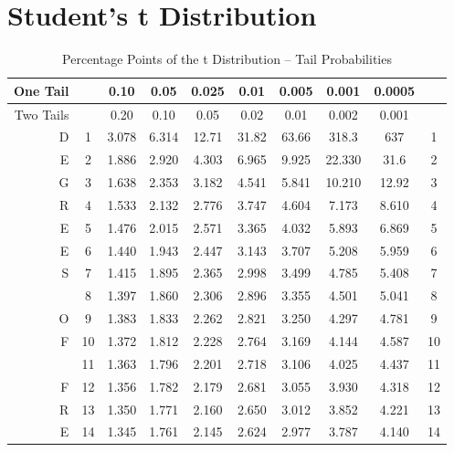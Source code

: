 \label{AppendixA}
\chapter{Student's t Distribution}
\newpage
{}

\begin{table}[H]
\caption{Percentage Points of the t Distribution -- Tail Probabilities} \label{Appendix}
\begin{center}
{\tiny \begin{tabular}{|r|c|c|c|c|c|c|c|c|c|}
\hline One Tail & & 0.10 & 0.05 & 0.025 & 0.01 & 0.005 & 0.001 & 0.0005 &\\ 
\hline Two Tails & & 0.20 &   0.10 &   0.05 &   0.02  &  0.01  &  0.002 & 0.001 & \\ 
\hline D  & 1 &   3.078  & 6.314 & 12.71  & 31.82  & 63.66 & 318.3  & 637 & 1  \\ 
\hline E  & 2 &   1.886  & 2.920 &  4.303 &  6.965 &  9.925 & 22.330 & 31.6 & 2 \\ 
\hline G  & 3 &   1.638  & 2.353 &  3.182 &  4.541 &  5.841 & 10.210 & 12.92  &   3  \\ 
\hline R  & 4 &   1.533  & 2.132 &  2.776 &  3.747 &  4.604 &  7.173 &  8.610 &   4  \\ 
\hline E  & 5 &   1.476 &  2.015 &  2.571 &  3.365 &  4.032 &  5.893 &  6.869 &   5 \\ 
\hline E  & 6 &   1.440 &  1.943 &  2.447 &  3.143 &  3.707 &  5.208 &  5.959 &   6  \\ 
\hline S  & 7 &   1.415 &  1.895 &  2.365 &  2.998 &  3.499 &  4.785 &  5.408 &   7  \\ 
\hline    & 8 &   1.397 &  1.860 &  2.306 &  2.896 &  3.355 &  4.501 &  5.041 &   8  \\ 
\hline O  & 9 &   1.383 &  1.833 &  2.262 &  2.821 &  3.250 &  4.297 &  4.781 &   9  \\ 
\hline F  &10 &   1.372 &  1.812 &  2.228 &  2.764 &  3.169 &  4.144 &  4.587 &  10 \\ 
\hline    &11 &   1.363 &  1.796 &  2.201 &  2.718 &  3.106 &  4.025 &  4.437 &  11  \\ 
\hline F  &12 &   1.356 &  1.782 &  2.179 &  2.681 &  3.055 &  3.930 &  4.318 &  12  \\ 
\hline R  &13 &   1.350 &  1.771 &  2.160 &  2.650 &  3.012 &  3.852 &  4.221 &  13  \\ 
\hline E  &14 &   1.345 &  1.761 &  2.145 &  2.624 &  2.977 &  3.787 &  4.140 &  14  \\ 

\end{tabular}}
\end{center}
\end{table}

